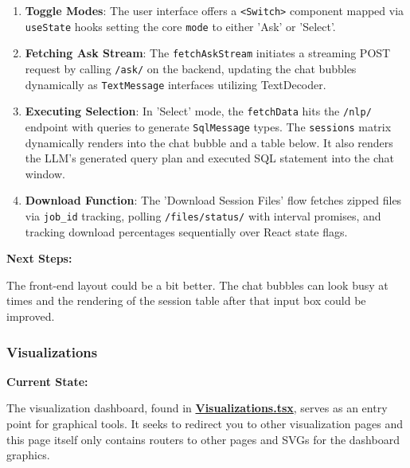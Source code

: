 \documentclass{article}
\begin{document}
\begin{enumerate}

  \item{\textbf{Toggle Modes}: The user interface offers a \texttt{<Switch>} component mapped via \texttt{useState} hooks setting the core \texttt{mode} to either 'Ask' or 'Select'.}
  \item{\textbf{Fetching Ask Stream}: The \texttt{fetchAskStream} initiates a streaming POST request by calling \texttt{/ask/} on the backend, updating the chat bubbles dynamically as \texttt{TextMessage} interfaces utilizing TextDecoder.}
  \item{\textbf{Executing Selection}: In 'Select' mode, the \texttt{fetchData} hits the \texttt{/nlp/} endpoint with queries to generate \texttt{SqlMessage} types. The \texttt{sessions} matrix dynamically renders into the chat bubble and a table below. It also renders the LLM's generated query plan and executed SQL statement into the chat window.}
  \item{\textbf{Download Function}: The 'Download Session Files' flow fetches zipped files via \texttt{job\_id} tracking, polling \texttt{/files/status/} with interval promises, and tracking download percentages sequentially over React state flags.}

\end{enumerate}
\par{\textbf{Next Steps:}}
\par{The front-end layout could be a bit better. The chat bubbles can look busy at times and the rendering of the session table after that input box
could be improved.}

\subsubsection{Visualizations}

\par{\textbf{Current State:}}
\par{The visualization dashboard, found in \href{https://github.com/OCD-Rats-Capstone/OCD-Rat-Infrastructure/blob/main/src/ocd-rat-frontend/src/pages/Visualizations.tsx}{\textbf{Visualizations.tsx}}, serves as an entry point for graphical tools. It seeks
to redirect you to other visualization pages and this page itself only contains routers to other pages and SVGs for the dashboard graphics.}
\end{document}
